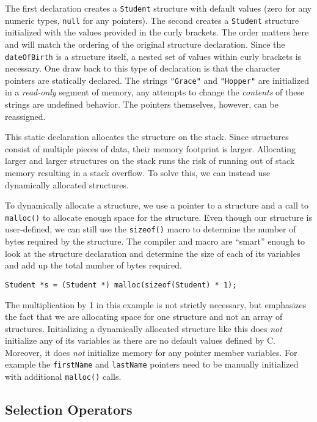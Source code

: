 The first declaration creates a \texttt{Student} structure
with default values (zero for any numeric types, \texttt{null}
for any pointers).  The second creates a \texttt{Student}
structure initialized with the values provided in the curly brackets.
The order matters here and will match the ordering of the original
structure declaration.  Since the \texttt{dateOfBirth} is a
structure itself, a nested set of values within curly brackets is 
necessary.  One draw back to this type of declaration is that the
character pointers are statically declared.  The strings \texttt{"Grace"} and \texttt{"Hopper"} are initialized in a 
\emph{read-only} segment of memory, any attempts to change
the \emph{contents} of these strings are undefined behavior.  
The pointers themselves, however, can be reassigned.

This static declaration allocates the structure on the stack.
Since structures consist of multiple pieces of data, their memory 
footprint is larger.  
Allocating larger and larger structures on the stack runs the
risk of running out of stack memory resulting in a 
 stack overflow.
To solve this, we can instead use dynamically allocated structures.

To dynamically allocate a structure, we use a pointer to a structure
and a call to \texttt{malloc()} to allocate enough space
for the structure.  Even though our structure is user-defined, we
can still use the \texttt{sizeof()} macro to determine
the number of bytes required by the structure.  The compiler and
macro are ``smart'' enough to look at the structure declaration and
determine the size of each of its variables and add up the total
number of bytes required.

\texttt{Student *s = (Student *) malloc(sizeof(Student) * 1);}

The multiplication by 1 in this example is not strictly necessary, but
emphasizes the fact that we are allocating space for one structure
and not an array of structures.  Initializing a dynamically allocated
structure like this does \emph{not} initialize any of its variables
as there are no default values defined by C.  Moreover, it does 
\emph{not} initialize memory for any pointer member variables.  For
example the \texttt{firstName} and \texttt{lastName}
pointers need to be manually initialized with additional 
\texttt{malloc()} calls.

\subsection{Selection Operators}

